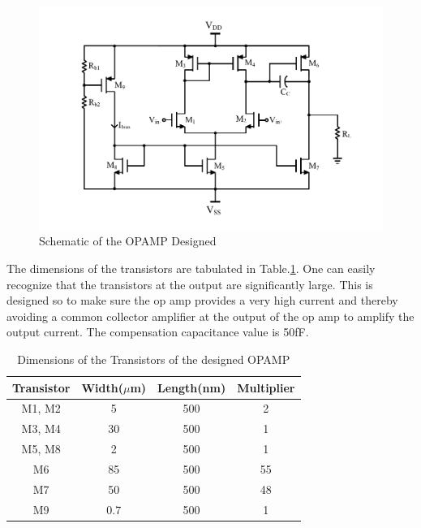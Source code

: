 \begin{figure} [H]
\centering
\includegraphics[scale=1]{Figures/Schematics/OPAMP_Vbias.pdf}
\caption{Schematic of the OPAMP Designed}
\label{fig:OPAMP_Schematic}
\end{figure}

The dimensions of the transistors are tabulated in Table.\ref{tab:OPAMP_dimensions}. One can easily recognize that the transistors at the output are significantly large. This is designed so to make sure the op amp provides a very high current and thereby avoiding a common collector amplifier at the output of the op amp to amplify the output current. The compensation capacitance value is 50fF.

\begin{table} [H]
\centering
\begin{tabular}{@{}cccc@{}}
\toprule
Transistor			& Width($\mu$m)		& Length(nm)		& Multiplier \\ \midrule
M1, M2				& 5					& 500				& 2			\\
M3, M4				& 30 				& 500				& 1			\\
M5, M8				& 2 				& 500				& 1			\\
M6					& 85 				& 500				& 55		\\ 
M7					& 50 				& 500				& 48		\\
M9					& 0.7				& 500				& 1			\\
\bottomrule
\end{tabular}
\caption{Dimensions of the Transistors of the designed OPAMP}
\label{tab:OPAMP_dimensions}
\end{table}

